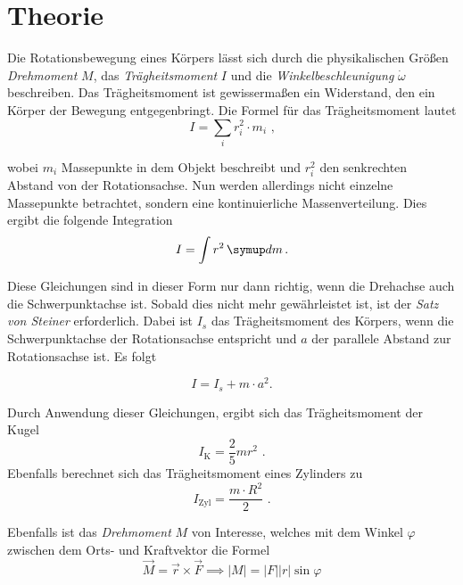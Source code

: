 \section{Theorie}
\label{sec:Theorie}
\setlength{\parindent}{0pt}

Die Rotationsbewegung eines Körpers lässt sich durch die physikalischen Größen \textit{Drehmoment} $M$, das 
\textit{Trägheitsmoment} $I$ und die \textit{Winkelbeschleunigung} $\dot{\omega}$ beschreiben.
Das Trägheitsmoment ist gewissermaßen ein Widerstand, den ein Körper der Bewegung entgegenbringt.
Die Formel für das Trägheitsmoment lautet
\begin{equation*}
    I = \sum_{i} r_{i}^2 \cdot m_{i} \text{ ,}
\end{equation*}

wobei $m_{i}$ Massepunkte in dem Objekt beschreibt und $r_{i}^2$ den senkrechten Abstand von der Rotationsachse.
Nun werden allerdings nicht einzelne Massepunkte betrachtet, sondern eine kontinuierliche Massenverteilung.
Dies ergibt die folgende Integration
\begin{equation}
    I = \int r^2 \dif{m} \text{.}
\end{equation}

Diese Gleichungen sind in dieser Form nur dann richtig, wenn die Drehachse auch die Schwerpunktachse ist.
Sobald dies nicht mehr gewährleistet ist, ist der \textit{Satz von Steiner} erforderlich.
Dabei ist $I_{s}$ das Trägheitsmoment des Körpers, wenn die Schwerpunktachse der Rotationsachse entspricht
und $a$ der parallele Abstand zur Rotationsachse ist. Es folgt

\begin{equation} \label{eq:SatzvSteiner}
    I = I_{s} + m \cdot a^2 \text{.}
\end{equation}

Durch Anwendung dieser Gleichungen, ergibt sich das Trägheitsmoment der Kugel
\begin{equation} \label{eq:AllgTreagKugel}
  I_{\text{K}} = \frac{2}{5} m r^2 \text{ .}
\end{equation}
Ebenfalls berechnet sich das Trägheitsmoment eines Zylinders zu
\begin{equation}\label{eq:AllgTreagZyl}
    I_{\text{Zyl}} = \frac{m \cdot R^2} {2} \text{ .}
  \end{equation}

Ebenfalls ist das \textit{Drehmoment} $M$ von Interesse, welches mit dem Winkel $\varphi$ zwischen dem Orts- und Kraftvektor die Formel
\begin{equation} \label{eq:drehmoment}
    \vec{M} = \vec{r} \times \vec{F} \implies \lvert M \rvert = \lvert F \rvert \lvert r \rvert \sin{\varphi}
\end{equation}

